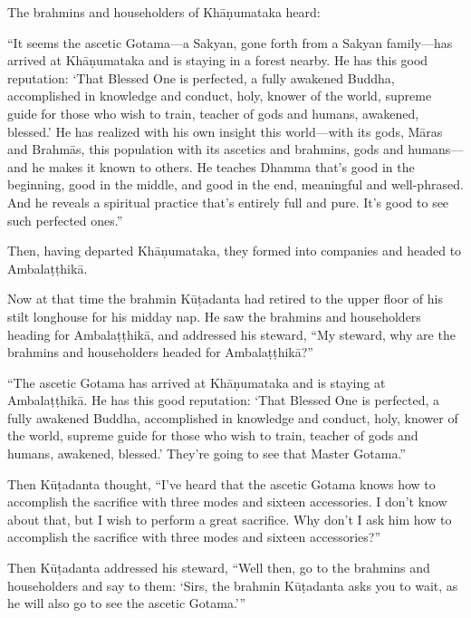 \documentclass[12pt,openany]{book}%
\begin{document}
The brahmins and householders of \textsanskrit{Khāṇumataka} heard: 

“It seems the ascetic Gotama—a Sakyan, gone forth from a Sakyan family—has arrived at \textsanskrit{Khāṇumataka} and is staying in a forest nearby. He has this good reputation: ‘That Blessed One is perfected, a fully awakened Buddha, accomplished in knowledge and conduct, holy, knower of the world, supreme guide for those who wish to train, teacher of gods and humans, awakened, blessed.’ He has realized with his own insight this world—with its gods, \textsanskrit{Māras} and \textsanskrit{Brahmās}, this population with its ascetics and brahmins, gods and humans—and he makes it known to others. He teaches Dhamma that’s good in the beginning, good in the middle, and good in the end, meaningful and well-phrased. And he reveals a spiritual practice that’s entirely full and pure. It’s good to see such perfected ones.” 

Then, having departed \textsanskrit{Khāṇumataka}, they formed into companies and headed to \textsanskrit{Ambalaṭṭhikā}. 

Now at that time the brahmin \textsanskrit{Kūṭadanta} had retired to the upper floor of his stilt longhouse for his midday nap. He saw the brahmins and householders heading for \textsanskrit{Ambalaṭṭhikā}, and addressed his steward, “My steward, why are the brahmins and householders headed for \textsanskrit{Ambalaṭṭhikā}?” 

“The ascetic Gotama has arrived at \textsanskrit{Khāṇumataka} and is staying at \textsanskrit{Ambalaṭṭhikā}. He has this good reputation: ‘That Blessed One is perfected, a fully awakened Buddha, accomplished in knowledge and conduct, holy, knower of the world, supreme guide for those who wish to train, teacher of gods and humans, awakened, blessed.’ They’re going to see that Master Gotama.” 

Then \textsanskrit{Kūṭadanta} thought, “I’ve heard that the ascetic Gotama knows how to accomplish the sacrifice with three modes and sixteen accessories. I don’t know about that, but I wish to perform a great sacrifice. Why don’t I ask him how to accomplish the sacrifice with three modes and sixteen accessories?” 

Then \textsanskrit{Kūṭadanta} addressed his steward, “Well then, go to the brahmins and householders and say to them: ‘Sirs, the brahmin \textsanskrit{Kūṭadanta} asks you to wait, as he will also go to see the ascetic Gotama.’” 
\end{document}
